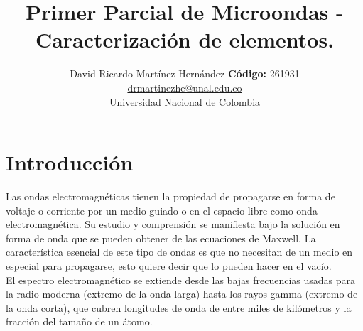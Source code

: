 \documentclass[12pt,graphicx,caption,rotating]{article}
\begin{document}
\title{\textbf{\huge{Primer Parcial de Microondas - Caracterización de elementos.}}}
\author{David Ricardo Martínez Hernández \textbf{Código:} 261931\\
	\href{}{drmartinezhe@unal.edu.co}\\
	Universidad Nacional de Colombia}
\date{}
\maketitle

\section{Introducción}
\noindent
Las ondas electromagnéticas tienen la propiedad de propagarse en forma de voltaje o corriente por un medio guiado o en el espacio libre como onda electromagnética. Su estudio y comprensión se manifiesta bajo la solución en forma de onda que se pueden obtener de las ecuaciones de Maxwell. La característica esencial de este tipo de ondas es que no necesitan de un medio en especial para propagarse, esto quiere decir que lo pueden hacer en el vacío.\\
El espectro electromagnético se extiende desde las bajas frecuencias usadas para la radio moderna (extremo de la onda larga) hasta los rayos gamma (extremo de la onda corta), que cubren longitudes de onda de entre miles de kilómetros y la fracción del tamaño de un átomo.
\end{document}
